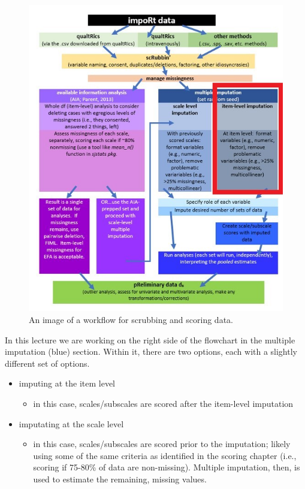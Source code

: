 \documentclass[
  11pt,
]{book}
\providecommand{\tightlist}{%
  \setlength{\itemsep}{0pt}\setlength{\parskip}{0pt}}
\begin{document}
\begin{figure}
\centering
\includegraphics{images/Ch05/scrubscore_mimp_itemlvl.jpg}
\caption{An image of a workflow for scrubbing and scoring data.}
\end{figure}

In this lecture we are working on the right side of the flowchart in the multiple imputation (blue) section. Within it, there are two options, each with a slightly different set of options.

\begin{itemize}
\tightlist
\item
  imputing at the item level

  \begin{itemize}
  \tightlist
  \item
    in this case, scales/subscales are scored after the item-level imputation
  \end{itemize}
\item
  imputating at the scale level

  \begin{itemize}
  \tightlist
  \item
    in this case, scales/subscales are scored prior to the imputation; likely using some of the same criteria as identified in the scoring chapter (i.e., scoring if 75-80\% of data are non-missing). Multiple imputation, then, is used to estimate the remaining, missing values.
  \end{itemize}
\end{itemize}
\end{document}
